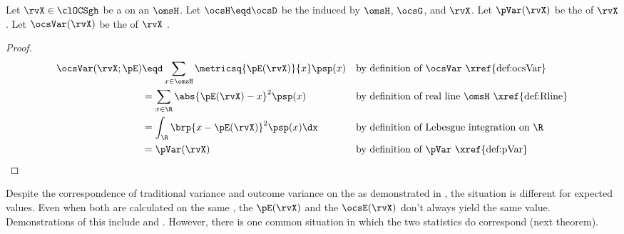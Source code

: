 \begin{theorem}
\label{thm:ocsVar}
Let $\rvX\in\clOCSgh$ be a  
on an   $\omsH$.
Let $\ocsH\eqd\ocsD$ be the   induced by $\omsH$, $\ocsG$, and $\rvX$.
Let $\pVar(\rvX)$ be the   of $\rvX$.
Let $\ocsVar(\rvX)$ be the  of $\rvX$ .
\end{theorem}
\begin{proof}
\begin{align*}
  \ocsVar(\rvX;\pE)
    &\eqd \sum_{x\in\omsH} \metricsq{\pE(\rvX)}{x}\psp(x)
    && \text{by definition of $\ocsVar$ \xref{def:ocsVar}}
  \\&= \sum_{x\in\R} \abs{\pE(\rvX)-x}^2\psp(x)
    && \text{by definition of real line $\omsH$ \xref{def:Rline}}
  \\&= \int_{\R} \brp{x-\pE(\rvX)}^2\psp(x) \dx
    && \text{by definition of Lebesgue integration on $\R$}
  \\&= \pVar(\rvX)
    && \text{by definition of $\pVar$ \xref{def:pVar}}
\end{align*}
\end{proof}

\begin{remark}
\label{rem:pEocsE}
Despite the correspondence of traditional variance and outcome variance on the  
as demonstrated in ,
the situation is different for expected values.
Even when both are calculated on the same ,
the  $\pE(\rvX)$  
and the  $\ocsE(\rvX)$  don't always yield the same value.
Demonstrations of this include  and .
However, there is one common situation in which the two statistics do correspond (next theorem).
\end{remark}


